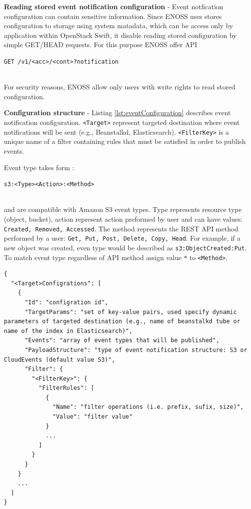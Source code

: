 \documentclass{ExcelAtFIT}
\begin{document}
\textbf{Reading stored event notification configuration} - Event notfication configuration can contain sensitive information. Since ENOSS uses stores configuration to storage using system matadata, which can be access only by application within OpenStack Swift, it disable reading stored configuration by simple GET/HEAD requests. For this purpose ENOSS offer API \\\centerline{\texttt{GET /v1/<acc>/<cont>?notification}}\\For security reasons, ENOSS allow only users with write rights to read stored configuration.

\textbf{Configuration structure} - Listing \ref{lst:eventConfiguration} describes event notification configuration. \texttt{<Target>} represent targeted destination where event notifications will be sent (e.g., Beanstalkd, Elasticsearch). \texttt{<FilterKey>} is a unique name of a filter containing rules that must be satisfied in order to publish events.

Event type takes form :\\\centerline{\texttt{s3:<Type><Action>:<Method>}}\\ and are compatible with Amazon S3 event types. Type represents resource type (object, bucket), action represent action preformed by user and can have values: \texttt{Created, Removed, Accessed}. The method represents the REST API method performed by a user: \texttt{Get, Put, Post, Delete, Copy, Head}. For example, if a new object was created, even type would be described as \texttt{s3:ObjectCreated:Put}. To match event type regardless of API method assign value \texttt{*} to \texttt{<Method>}.

\begin{lstlisting}[style=jsonStyle, caption=Strucute of event notification configuration,    label=lst:eventConfiguration]
{
  "<Target>Configrations": [
    {
      "Id": "configration id",
      "TargetParams": "set of key-value pairs, used specify dynamic parameters of targeted destination (e.g., name of beanstalkd tube or name of the index in Elasticsearch)",
      "Events": "array of event types that will be published",
      "PayloadStructure": "type of event notification structure: S3 or CloudEvents (default value S3)",
      "Filter": {
        "<FilterKey>": {
          "FilterRules": [
            {
              "Name": "filter operations (i.e. prefix, sufix, size)",
              "Value": "filter value"
            }
            ...
          ]
        }
      }
    }
    ...
  ]
}
\end{lstlisting}
\end{document}
